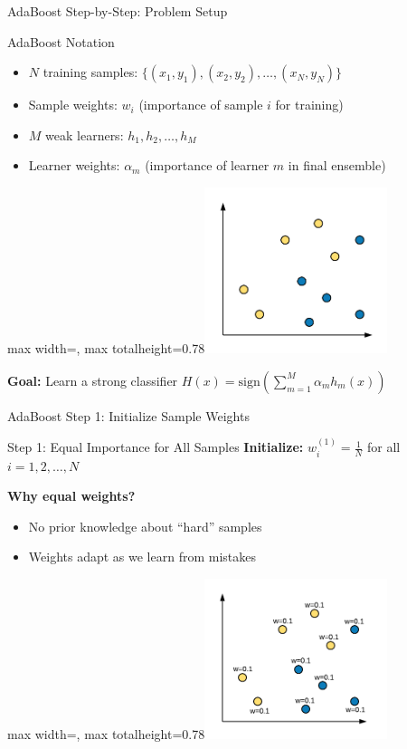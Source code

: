 \documentclass[8pt]{beamer}
\newcommand{\fitpic}[1]{\begin{adjustbox}{max width=\linewidth, max totalheight=0.78\textheight}#1\end{adjustbox}}
\begin{document}
\begin{frame}{AdaBoost Step-by-Step: Problem Setup}
\begin{definitionbox}{AdaBoost Notation}
\begin{itemize}
\item $N$ training samples: $\{(x_1, y_1), (x_2, y_2), \ldots, (x_N, y_N)\}$
\item Sample weights: $w_i$ (importance of sample $i$ for training)
\item $M$ weak learners: $h_1, h_2, \ldots, h_M$
\item Learner weights: $\alpha_m$ (importance of learner $m$ in final ensemble)
\end{itemize}
\end{definitionbox}

  \vspace{0.3cm}
  \centering
  \fitpic{\includegraphics[width = 0.4\textwidth]{../assets/ensemble/diagrams/ada_data}}

\begin{keypointsbox}
\textbf{Goal:} Learn a strong classifier $H(x) = \text{sign}\left(\sum_{m=1}^M \alpha_m h_m(x)\right)$
\end{keypointsbox}
\end{frame}

\begin{frame}{AdaBoost Step 1: Initialize Sample Weights}
\begin{alertbox}{Step 1: Equal Importance for All Samples}
\textbf{Initialize:} $w_i^{(1)} = \frac{1}{N}$ for all $i = 1, 2, \ldots, N$
\end{alertbox}

\textbf{Why equal weights?}
\begin{itemize}
\item No prior knowledge about ``hard'' samples
\item Weights adapt as we learn from mistakes
\end{itemize}

  \vspace{0.3cm}
  \centering
  \fitpic{\includegraphics[width = 0.4\textwidth]{../assets/ensemble/diagrams/ada_data_init_weights}}
\end{frame}
\end{document}
